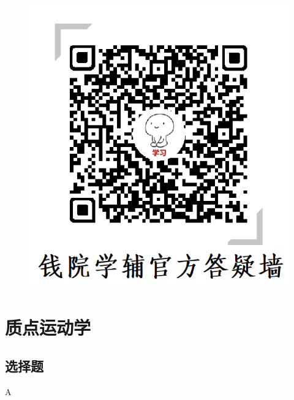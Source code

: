 \documentclass[b5paper,opensource,sourcefont,parskip]{qyxf-book}
\begin{document}
\begin{figure}[!h]
\begin{minipage}[c]{0.5\textwidth}
		\includegraphics[scale=0.5]{qxf.png}
	\end{minipage}
\end{figure}


\cleardoublepage

\tableofcontents

\setlength{\parindent}{0pt}
\chapter{质点运动学}
\section{选择题}
A
\end{document}
